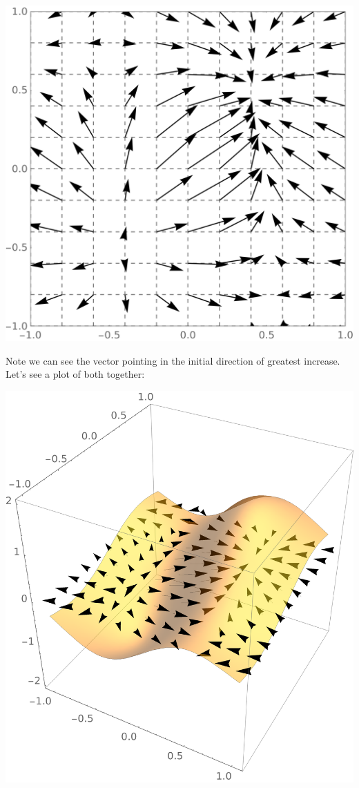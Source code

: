 \documentclass{ximera}
\begin{document}
\begin{example}
\begin{image}
    \includegraphics{gradField1.png}
  \end{image}
  Note we can see the vector pointing in the initial direction of
  greatest increase. Let's see a plot of both together:
  \begin{image}
    \includegraphics{gradSurf1.png}
  \end{image}
\end{example}
\end{document}

